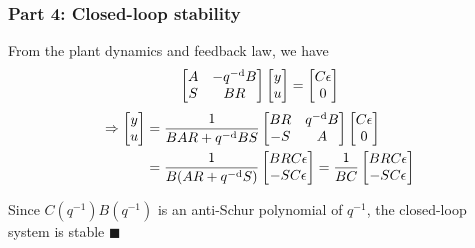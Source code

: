 \begin{frame}
    \frametitle{Part 4: Closed-loop stability}

    From the plant dynamics and feedback law, we have
    \begin{align*}
        \begin{bmatrix}
                A & -q^{-\textrm{d}} B \\
                S & BR
            \end{bmatrix} \begin{bmatrix}
                y \\
                u
            \end{bmatrix} = \begin{bmatrix}
                C\epsilon \\
                0
            \end{bmatrix}
    \end{align*}
    \pause
    \begin{align*}
        \Rightarrow \begin{bmatrix}
                y \\
                u
            \end{bmatrix} & = \frac{1}{BAR + q^{-\textrm{d}} BS} \begin{bmatrix}
                BR & q^{-\textrm{d}} B \\
                -S & A
            \end{bmatrix} \begin{bmatrix}
                C\epsilon \\
                0
            \end{bmatrix} \\
        & = \frac{1}{B(AR + q^{-\textrm{d}} S)} \begin{bmatrix}
                BRC\epsilon \\
                -SC\epsilon
            \end{bmatrix} = \frac{1}{BC} \begin{bmatrix}
                BRC\epsilon \\
                -SC\epsilon
            \end{bmatrix}
    \end{align*}
    \paused

    Since $C(q^{-1}) B(q^{-1})$ is an anti-Schur polynomial of $q^{-1}$, the closed-loop system is stable
    \hfill $\blacksquare$

\end{frame}

